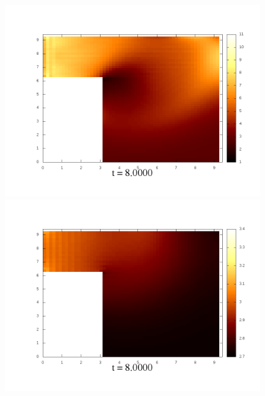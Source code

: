 \documentclass[a4paper, 12pt]{article}
\begin{document}
\begin{figure}[h]
\begin{minipage}[h]{0.4\linewidth}
	\includegraphics[width=1\linewidth]{./img/01_1_1/G/40}
\end{minipage}
\hfill
\begin{minipage}[h]{0.4\linewidth}
	\includegraphics[width=1\linewidth]{./img/01_1_01/G/40}
\end{minipage}
\end{figure}
\end{document}
